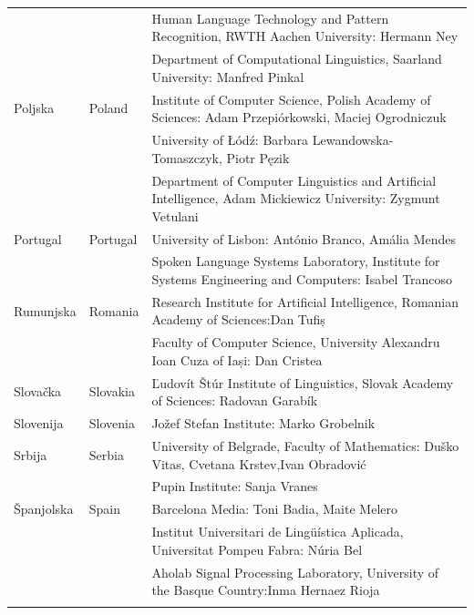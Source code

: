 \begin{longtable}{llp{115mm}}
  & & Human Language Technology and Pattern Recognition, RWTH Aachen University: Hermann Ney\\ \addlinespace
   & & Department of Computational Linguistics, Saarland University: Manfred Pinkal \\ \addlinespace
  Poljska & \textcolor{grey1}{Poland} & Institute of Computer Science, Polish Academy of Sciences: \newline Adam Przepiórkowski, Maciej Ogrodniczuk \\ \addlinespace
  & & University of Łódź: Barbara Lewandowska-Tomaszczyk, Piotr Pęzik\\ \addlinespace
  & & Department of Computer Linguistics and Artificial Intelligence, Adam Mickiewicz University: Zygmunt Vetulani \\ \addlinespace
  Portugal & \textcolor{grey1}{Portugal} & University of Lisbon: António Branco, Amália Mendes \\ \addlinespace
  & & Spoken Language Systems Laboratory, Institute for Systems Engineering and Computers: Isabel Trancoso \\ \addlinespace
  Rumunjska & \textcolor{grey1}{Romania} & Research Institute for Artificial Intelligence, Romanian Academy of Sciences:\newline Dan Tufiș \\ \addlinespace
  & & Faculty of Computer Science, University Alexandru Ioan Cuza of Iași: Dan Cristea \\ \addlinespace
    Slovačka & \textcolor{grey1}{Slovakia} & Ľudovít Štúr Institute of Linguistics, Slovak Academy of Sciences: Radovan Garabík \\ \addlinespace 
  Slovenija & \textcolor{grey1}{Slovenia} & Jožef Stefan Institute: Marko Grobelnik \\ \addlinespace 
  Srbija & \textcolor{grey1}{Serbia} & University of Belgrade, Faculty of Mathematics: Duško Vitas, Cvetana Krstev,\newline Ivan Obradović \\ \addlinespace
  & & Pupin Institute: Sanja Vranes \\ \addlinespace  
  Španjolska & \textcolor{grey1}{Spain} & Barcelona Media: Toni Badia, Maite Melero \\ \addlinespace 
  & & Institut Universitari de Lingüística Aplicada, Universitat Pompeu Fabra: Núria Bel \\ \addlinespace 
  & & Aholab Signal Processing Laboratory, University of the Basque Country:\newline Inma Hernaez Rioja \\ \addlinespace 

\end{longtable}

